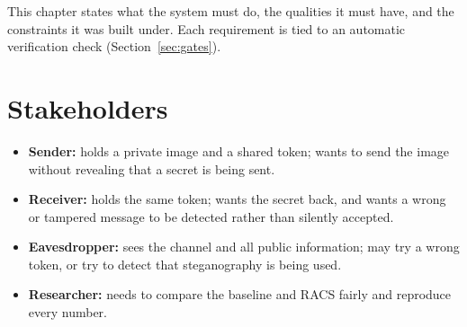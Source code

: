 This chapter states what the system must do, the qualities it must have, and the
constraints it was built under. Each requirement is tied to an automatic verification check
(Section~\ref{sec:gates}).

\section{Stakeholders}
\begin{itemize}
	\item \textbf{Sender:} holds a private image and a shared token; wants to send the image
	without revealing that a secret is being sent.
	\item \textbf{Receiver:} holds the same token; wants the secret back, and wants a wrong or
	tampered message to be detected rather than silently accepted.
	\item \textbf{Eavesdropper:} sees the channel and all public information; may try a wrong
	token, or try to detect that steganography is being used.
	\item \textbf{Researcher:} needs to compare the baseline and RACS fairly and reproduce every
	number.
\end{itemize}

